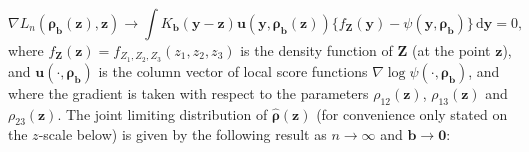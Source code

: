\documentclass[
  12pt,
  letterpaper]{article}
\newcommand{\Z}{\bm{Z}}
\newcommand{\z}{\bm{z}}
\newcommand{\y}{\bm{y}}
\newcommand{\fu}{\bm{u}}
\newcommand{\frho}{\bm{\rho}}
\newcommand{\hfrho}{\widehat{\bm{\rho}}}
\newcommand{\hh}{\bm{b}}
\theoremstyle{definition}
\theoremstyle{definition}
\theoremstyle{definition}
\theoremstyle{remark}
\begin{document}
\begin{equation}
\nabla L_n(\frho_{\hh}(\z), \z) \rightarrow \int K_{\hh}(\y - \z)\fu(\y, \frho_{\hh}(\z))\{f_{\Z}(\y) - \psi(\y, \frho_{\hh})\}\,\textrm{d}\y = 0,
\label{eq:popfixedh3}
\end{equation}
where \(f_{\Z}(\z) = f_{Z_1,Z_2,Z_3}(z_1,z_2,z_3)\) is the density function of \(\Z\) (at the point \(\z\)), and \(\fu(\cdot, \frho_{\hh})\) is the column vector of local score functions \(\nabla \log\psi(\cdot, \frho_{\hh})\), and where the gradient is taken with respect to the parameters \(\rho_{12}(\z)\), \(\rho_{13}(\z)\) and \(\rho_{23}(\z)\). The joint limiting distribution of \(\hfrho(\z)\) (for convenience only stated on the \(z\)-scale below) is given by the following result as \(n \rightarrow \infty\) and \(\hh \rightarrow \bm{0}\):
\end{document}

